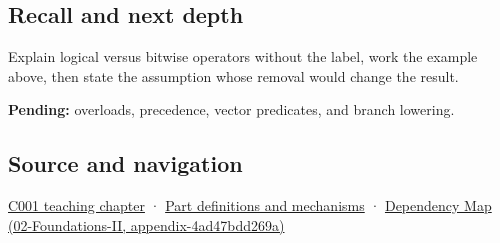 \subsection{Recall and next depth}\label{appendix-fe6b457d68d8-recall-and-next-depth}

Explain logical versus bitwise operators without the label, work the example above, then state the assumption whose removal would change the result.

\textbf{Pending:} overloads, precedence, vector predicates, and branch lowering.

\subsection{Source and navigation}\label{appendix-fe6b457d68d8-source-and-navigation}

\hyperref[01-foundations-i-ch001-from-a-signal-to-an-interpretation]{C001 teaching chapter} · \hyperref[appendix-fd090d982a15]{Part definitions and mechanisms} · \href{../02-Foundations-II/main.pdf\#nameddest=appendix-4ad47bdd269a}{Dependency Map (02-Foundations-II, appendix-4ad47bdd269a)}
